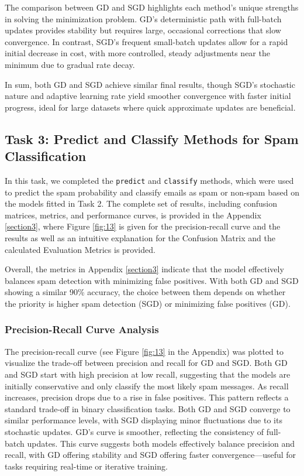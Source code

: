 \documentclass[a4paper,oneside,bibliography=totoc]{scrartcl}
\begin{document}
The comparison between GD and SGD highlights each method’s unique strengths in solving the minimization problem. GD’s deterministic path with full-batch updates provides stability but requires large, occasional corrections that slow convergence. In contrast, SGD’s frequent small-batch updates allow for a rapid initial decrease in cost, with more controlled, steady adjustments near the minimum due to gradual rate decay.

In sum, both GD and SGD achieve similar final results, though SGD’s stochastic nature and adaptive learning rate yield smoother convergence with faster initial progress, ideal for large datasets where quick approximate updates are beneficial.

\subsection{Task 3: Predict and Classify Methods for Spam Classification}

In this task, we completed the \texttt{predict} and \texttt{classify} methods, which were used to predict the spam probability and classify emails as spam or non-spam based on the models fitted in Task 2. The complete set of results, including confusion matrices, metrics, and performance curves, is provided in the Appendix \ref{section3}, where Figure \ref{fig:13} is given for the precision-recall curve and the results as well as an intuitive explanation for the Confusion Matrix and the calculated Evaluation Metrics is provided.

Overall, the metrics in Appendix \ref{section3} indicate that the model effectively balances spam detection with minimizing false positives. With both GD and SGD showing a similar 90\% accuracy, the choice between them depends on whether the priority is higher spam detection (SGD) or minimizing false positives (GD).

\subsubsection{Precision-Recall Curve Analysis}
The precision-recall curve (see Figure \ref{fig:13} in the Appendix) was plotted to visualize the trade-off between precision and recall for GD and SGD. Both GD and SGD start with high precision at low recall, suggesting that the models are initially conservative and only classify the most likely spam messages. As recall increases, precision drops due to a rise in false positives. This pattern reflects a standard trade-off in binary classification tasks. Both GD and SGD converge to similar performance levels, with SGD displaying minor fluctuations due to its stochastic updates. GD’s curve is smoother, reflecting the consistency of full-batch updates.
This curve suggests both models effectively balance precision and recall, with GD offering stability and SGD offering faster convergence—useful for tasks requiring real-time or iterative training.
\end{document}
